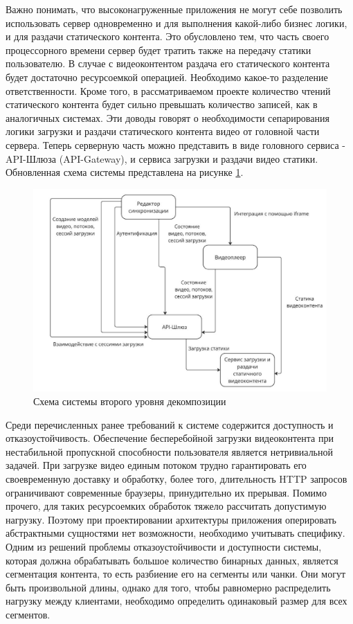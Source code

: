 	Важно понимать, что высоконагруженные приложения не могут себе позволить использовать сервер одновременно и для выполнения какой-либо бизнес логики, и для раздачи статического контента. Это обусловлено тем, что часть своего процессорного времени сервер будет тратить также на передачу статики пользователю. В случае с видеоконтентом раздача его статического контента будет достаточно ресурсоемкой операцией. Необходимо какое-то разделение ответственности. Кроме того, в рассматриваемом проекте количество чтений статического контента будет сильно превышать количество записей, как в аналогичных системах. Эти доводы говорят о необходимости сепарирования логики загрузки и раздачи статического контента видео от головной части сервера. Теперь серверную часть можно представить в виде головного сервиса - API-Шлюза (API-Gateway), и сервиса загрузки и раздачи видео статики. Обновленная схема системы представлена на рисунке \ref{fig:system_scheme_2}.

	\begin{figure}[ht!] 
		\center
		\includegraphics [scale=0.37] {my_folder/images//system_scheme_2}
		\caption{Схема системы второго уровня декомпозиции} 
		\label{fig:system_scheme_2}  
	\end{figure}
	
	 Среди перечисленных ранее требований к системе содержится доступность и отказоустойчивость. Обеспечение бесперебойной загрузки видеоконтента при нестабильной пропускной способности пользователя является нетривиальной задачей. При загрузке видео единым потоком трудно гарантировать его своевременную доставку и обработку, более того, длительность HTTP запросов ограничивают современные браузеры, принудительно их прерывая. Помимо прочего, для таких ресурсоемких обработок тяжело рассчитать допустимую нагрузку. Поэтому при проектировании архитектуры приложения оперировать абстрактными сущностями нет возможности, необходимо учитывать специфику. Одним из решений проблемы отказоустойчивости и доступности системы, которая должна обрабатывать большое количество бинарных данных, является сегментация контента, то есть разбиение его на сегменты или чанки. Они могут быть произвольной длины, однако для того, чтобы равномерно распределить нагрузку между клиентами, необходимо определить одинаковый размер для всех сегментов.

